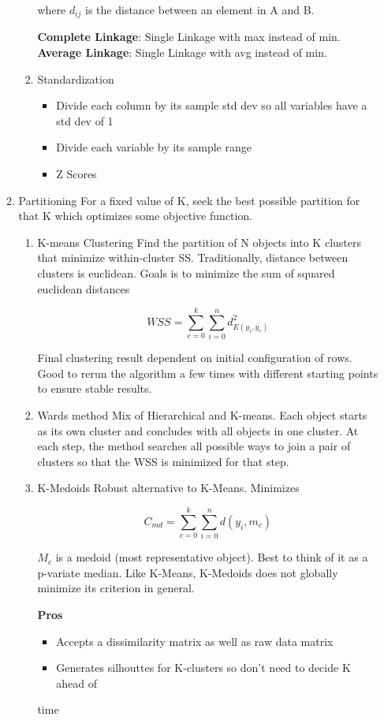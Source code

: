 \documentclass[11pt]{article}
\begin{document}
\begin{enumerate}
\begin{enumerate}
\begin{enumerate}
where \(d_{ij}\) is the distance between an element in A and B.

\textbf{Complete Linkage}: Single Linkage with max instead of min. \textbf{Average
Linkage}: Single Linkage with avg instead of min.

\item Standardization
\label{sec:orgc1a0943}
\begin{itemize}
\item Divide each column by its sample std dev so all variables have a std
dev of 1
\item Divide each variable by its sample range
\item Z Scores
\end{itemize}
\end{enumerate}

\item Partitioning
\label{sec:org6a2c3d9}
For a fixed value of K, seek the best possible partition for that K
which optimizes some objective function.

\begin{enumerate}
\item K-means Clustering
\label{sec:org9079c92}
Find the partition of N objects into K clusters that minimize
within-cluster SS. Traditionally, distance between clusters is
euclidean. Goals is to minimize the sum of squared euclidean distances

$$
WSS = \sum_{c = 0}^k \sum_{i = 0}^n d^2_{E(y_i, \bar{y_c})}
$$

Final clustering result dependent on initial configuration of rows. Good
to rerun the algorithm a few times with different starting points to
ensure stable results.

\item Wards method
\label{sec:orgd7b2c6f}
Mix of Hierarchical and K-means. Each object starts as its own cluster
and concludes with all objects in one cluster. At each step, the method
searches all possible ways to join a pair of clusters so that the WSS is
minimized for that step.

\item K-Medoids
\label{sec:orgeffda69}
Robust alternative to K-Means. Minimizes

$$
C_{md} = \sum_{c = 0}^k \sum_{i = 0}^n d(y_i, m_c)
$$

\(M_c\) is a medoid (most representative object). Best to think of it as a
p-variate median. Like K-Means, K-Medoids does not globally minimize its
criterion in general.

\textbf{Pros}
\begin{itemize}
\item Accepts a dissimilarity matrix as well as raw data matrix
\item Generates silhouttes for K-clusters so don't need to decide K ahead of
\end{itemize}
time


\end{enumerate}
\end{enumerate}
\end{enumerate}
\end{document}

